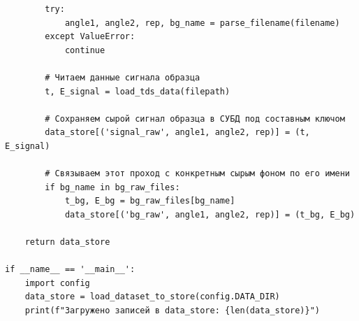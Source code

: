 \begin{verbatim}
        try:
            angle1, angle2, rep, bg_name = parse_filename(filename)
        except ValueError:
            continue
            
        # Читаем данные сигнала образца
        t, E_signal = load_tds_data(filepath)
        
        # Сохраняем сырой сигнал образца в СУБД под составным ключом
        data_store[('signal_raw', angle1, angle2, rep)] = (t, E_signal)
        
        # Связываем этот проход с конкретным сырым фоном по его имени
        if bg_name in bg_raw_files:
            t_bg, E_bg = bg_raw_files[bg_name]
            data_store[('bg_raw', angle1, angle2, rep)] = (t_bg, E_bg)
            
    return data_store

if __name__ == '__main__':
    import config
    data_store = load_dataset_to_store(config.DATA_DIR)
    print(f"Загружено записей в data_store: {len(data_store)}")
\end{verbatim}

